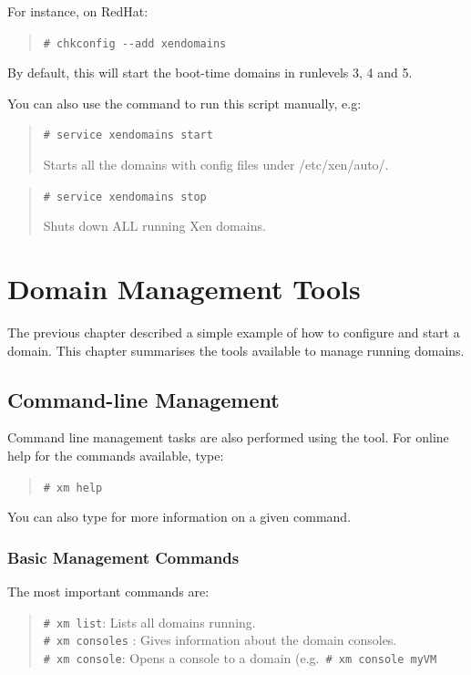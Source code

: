 \documentclass[11pt,twoside,final,openright]{report}
\begin{document}
For instance, on RedHat:

\begin{quote}
\verb_# chkconfig --add xendomains_
\end{quote}

By default, this will start the boot-time domains in runlevels 3, 4
and 5.

You can also use the  command to run this script
manually, e.g:

\begin{quote}
\verb_# service xendomains start_

Starts all the domains with config files under /etc/xen/auto/.
\end{quote}


\begin{quote}
\verb_# service xendomains stop_

Shuts down ALL running Xen domains.
\end{quote}

\chapter{Domain Management Tools}

The previous chapter described a simple example of how to configure
and start a domain.  This chapter summarises the tools available to
manage running domains.

\section{Command-line Management}

Command line management tasks are also performed using the 
tool.  For online help for the commands available, type:
\begin{quote}
\verb_# xm help_
\end{quote}

You can also type  for more information 
on a given command. 

\subsection{Basic Management Commands}

The most important  commands are: 
\begin{quote}
\verb_# xm list_: Lists all domains running.\\
\verb_# xm consoles_ : Gives information about the domain consoles.\\
\verb_# xm console_: Opens a console to a domain (e.g.\
  \verb_# xm console myVM_
\end{quote}
\end{document}
